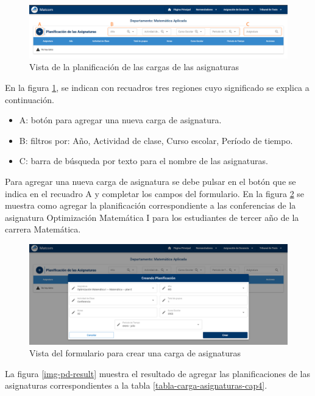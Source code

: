 \begin{figure}[H]
    \includegraphics[scale=0.3]{Graphics/Implementation/Docencia/PD-empty.png}
    \caption{Vista de la planificación de las cargas de las asignaturas}
    \label{img-pd-example}
\end{figure}


En la figura \ref{img-pd-example},
se indican con recuadros tres regiones cuyo significado se explica a continuación.

\begin{itemize}
    \item A: botón para agregar una nueva carga de asignatura.
    \item B: filtros por: Año, Actividad de clase, Curso escolar, Período de tiempo.
    \item C: barra de búsqueda por texto para el nombre de las asignaturas. 
\end{itemize}


Para agregar una nueva carga de asignatura se debe pulsar en el 
botón que se indica en el recuadro A y completar los campos del formulario. 
En la figura \ref{img-pd-form} se muestra como agregar la planificación
correspondiente a las conferencias de la asignatura Optimización
Matemática I para los estudiantes de tercer año de la carrera Matemática. 

\begin{figure}[H]
    \includegraphics[scale=0.3]{Graphics/Implementation/Docencia/PD-form.png}
    \caption{Vista del formulario para crear una carga de asignaturas}
    \label{img-pd-form}
\end{figure}


La figura \ref{img-pd-result} muestra el resultado de agregar las planificaciones de las asignaturas 
correspondientes a la tabla \ref{tabla-carga-asignaturas-cap4}. 


